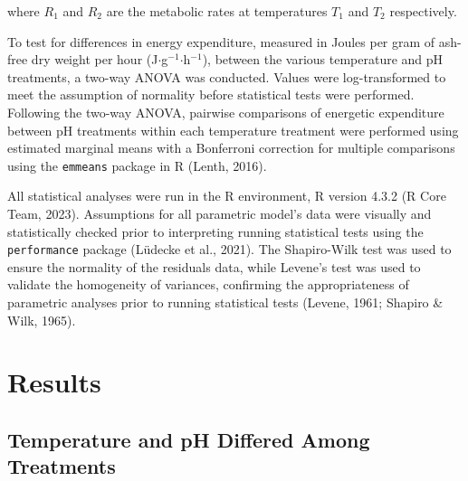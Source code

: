 \documentclass{CSUNthesis}
\begin{document}
where \(R_1\) and \(R_2\) are the metabolic rates at temperatures \(T_1\) and \(T_2\) respectively.

To test for differences in energy expenditure, measured in Joules per gram of ash-free dry weight per hour (J\(\cdot\)g\(^{-1}\)\(\cdot\)h\(^{-1}\)), between the various temperature and pH treatments, a two-way ANOVA was conducted. Values were log-transformed to meet the assumption of normality before statistical tests were performed. Following the two-way ANOVA, pairwise comparisons of energetic expenditure between pH treatments within each temperature treatment were performed using estimated marginal means with a Bonferroni correction for multiple comparisons using the \texttt{emmeans} package in R (Lenth, 2016).

All statistical analyses were run in the R environment, R version 4.3.2 (R Core Team, 2023). Assumptions for all parametric model's data were visually and statistically checked prior to interpreting running statistical tests using the \texttt{performance} package (Lüdecke et al., 2021). The Shapiro-Wilk test was used to ensure the normality of the residuals data, while Levene's test was used to validate the homogeneity of variances, confirming the appropriateness of parametric analyses prior to running statistical tests (Levene, 1961; Shapiro \& Wilk, 1965).

\section*{Results}\label{results}

\subsection*{Temperature and pH Differed Among Treatments}\label{temperature-and-ph-differed-among-treatments}
\end{document}
